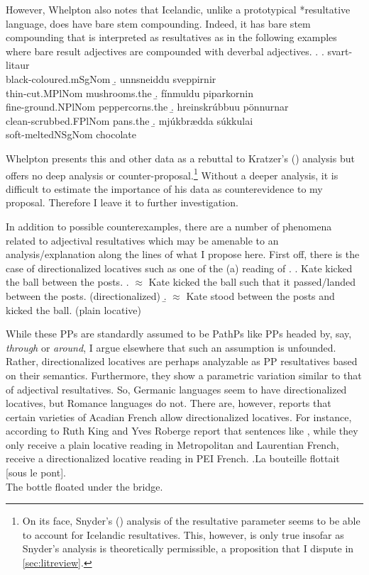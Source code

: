 However, Whelpton also notes that Icelandic, unlike a prototypical *resultative	language, does have bare stem compounding.
Indeed, it has bare stem compounding that is interpreted as resultatives as in the following examples where bare result adjectives are compounded with deverbal adjectives.
\ex. 
\a. svart-lita\dh{}ur\\
black-coloured.mSgNom
\b. \th{}unnsneiddu sveppirnir\\
thin-cut.MPlNom mushrooms.the
\b. f\'{i}nmuldu piparkornin\\
fine-ground.NPlNom peppercorns.the
\b. hreinskr\'{u}bbu\dh{}u p\"{o}nnurnar\\
clean-scrubbed.FPlNom pans.the
\b. mj\'{u}kbr\ae{}dda s\'{u}kkula\dh{}i\\
soft-meltedNSgNom chocolate

Whelpton presents this and other data as a rebuttal to Kratzer's (\citeyear{kratzer2004building}) analysis but offers no deep analysis or counter-proposal.\footnote{
	On its face, Snyder's (\citeyear{snyder2012parameter}) analysis of the resultative parameter seems to be able to account for Icelandic resultatives.
	This, however, is only true insofar as Snyder's analysis is theoretically permissible, a proposition that I dispute in \cref{sec:litreview}.
}
Without a deeper analysis, it is difficult to estimate the importance of his data as counterevidence to my proposal.
Therefore I leave it to further investigation.

In addition to possible counterexamples, there are a number of phenomena related to adjectival resultatives which may be amenable to an analysis/explanation along the lines of what I propose here.
First off, there is the case of directionalized locatives such as one of the (a) reading of \Next.
\ex. Kate kicked the ball between the posts.
\a. $\approx$ Kate kicked the ball such that it passed/landed between the posts. (directionalized)
\b. $\approx$ Kate stood between the posts and kicked the ball. (plain locative)

While these PPs are standardly assumed to be PathPs like PPs headed by, say, \textit{through} or \textit{around}, I argue elsewhere \parencite{milway20xxmodifying} that such an assumption is unfounded.
Rather, directionalized locatives are perhaps analyzable as PP resultatives based on their semantics.
Furthermore, they show a parametric variation similar to that of adjectival resultatives.
So, Germanic languages seem to have directionalized locatives, but Romance languages do not.
There are, however, reports that certain varieties of Acadian French allow directionalized locatives.
For instance, according to Ruth King and Yves Roberge \parencite[p.c. cited in][253--254]{rooryck1996prepositions} report that sentences like \Next, while they only receive a plain locative reading in Metropolitan and Laurentian French, receive a directionalized locative reading in PEI French.
\ex.La bouteille flottait [sous le pont].\\
The bottle floated under the bridge. \parencite{rooryck1996prepositions}

